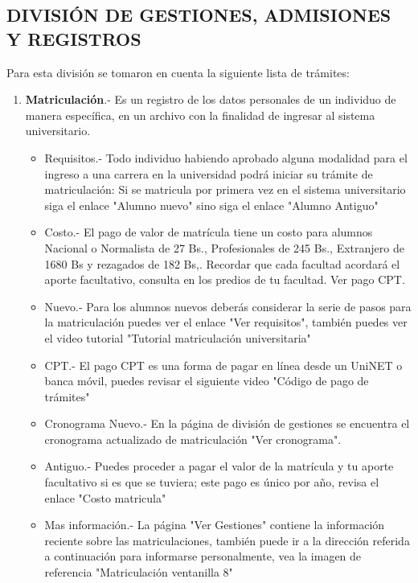 \documentclass[letter, openright, 12pt]{book}
\begin{document}
\subsection{DIVISIÓN DE GESTIONES, ADMISIONES Y REGISTROS}


Para esta división se tomaron en cuenta la siguiente lista de trámites:

\begin{enumerate}[label=(\alph*)]

\item \textbf{Matriculación}.- Es un registro de los datos personales de un individuo de manera específica, en un archivo con la finalidad de ingresar al sistema universitario. 
\begin{itemize}
\item Requisitos.- Todo individuo habiendo aprobado alguna modalidad para el ingreso a una carrera en la universidad podrá iniciar su trámite de matriculación: Si se matricula por primera vez en el sistema universitario siga el enlace "Alumno nuevo" sino siga el enlace "Alumno Antiguo"
\item Costo.- El pago de valor de matrícula tiene un costo para alumnos Nacional o Normalista de 27 Bs., Profesionales de 245 Bs., Extranjero de 1680 Bs y rezagados de 182 Bs,. Recordar que cada facultad acordará el aporte facultativo, consulta en los predios de tu facultad. Ver pago CPT.
\item Nuevo.- Para los alumnos nuevos deberás considerar la serie de pasos para la matriculación puedes ver el enlace "Ver requisitos", también puedes ver el video tutorial "Tutorial matriculación universitaria"
\item CPT.- El pago CPT es una forma de pagar en línea desde un UniNET o banca móvil, puedes revisar el siguiente video "Código de pago de trámites"
\item Cronograma Nuevo.- En la página de división de gestiones se encuentra el cronograma actualizado de matriculación "Ver cronograma".
\item Antiguo.- Puedes proceder a pagar el valor de la matrícula y tu aporte facultativo si es que se tuviera; este pago es único por año, revisa el enlace "Costo matricula"

\item Mas información.- La página "Ver Gestiones" contiene la información reciente sobre las matriculaciones, también puede ir a la dirección referida a continuación para informarse personalmente, vea la imagen de referencia "Matriculación ventanilla 8"


\end{itemize}
\end{enumerate}
\end{document}
